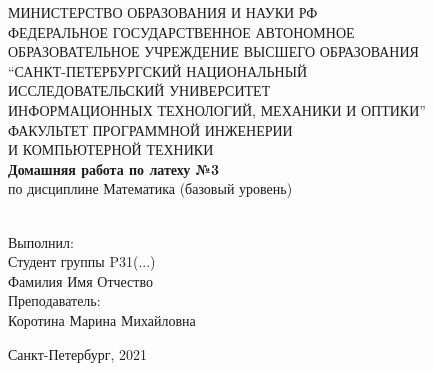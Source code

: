 \begin{center}
МИНИСТЕРСТВО ОБРАЗОВАНИЯ И НАУКИ РФ\\
\hfill \break
ФЕДЕРАЛЬНОЕ ГОСУДАРСТВЕННОЕ АВТОНОМНОЕ \\ ОБРАЗОВАТЕЛЬНОЕ УЧРЕЖДЕНИЕ ВЫСШЕГО ОБРАЗОВАНИЯ \\
“САНКТ-ПЕТЕРБУРГСКИЙ НАЦИОНАЛЬНЫЙ \\ 
ИССЛЕДОВАТЕЛЬСКИЙ УНИВЕРСИТЕТ \\ ИНФОРМАЦИОННЫХ ТЕХНОЛОГИЙ, МЕХАНИКИ И ОПТИКИ” \\

\hfill \break
ФАКУЛЬТЕТ ПРОГРАММНОЙ ИНЖЕНЕРИИ \\ И КОМПЬЮТЕРНОЙ ТЕХНИКИ \\
\vspace{2.5cm}
\large{\textbf{Домашняя работа по латеху №3}}\\
по дисциплине Математика (базовый уровень)\\
\hfill \break
\\
\end{center}

\vspace{5cm}
 
\begin{flushright}
Выполнил:\\
Студент группы P31(...)\\
Фамилия Имя Отчество\\
Преподаватель:\\
Коротина Марина Михайловна\\
\end{flushright}
 
\vfill


\begin{center} Санкт-Петербург, 2021 \end{center}

\thispagestyle{empty}
\newpage
